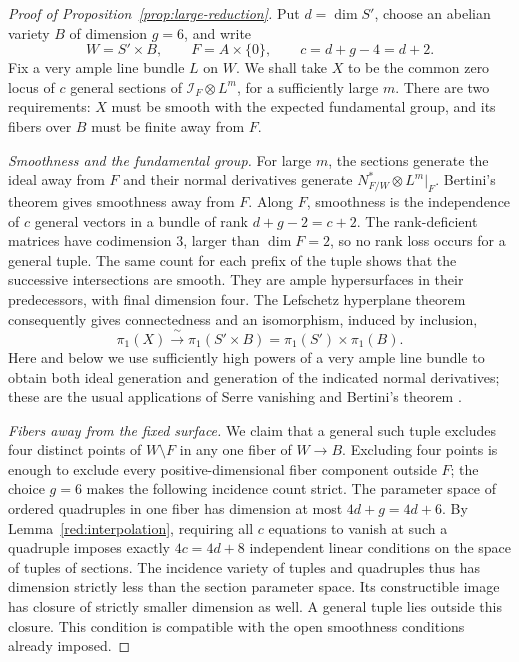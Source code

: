 \begin{proof}[Proof of Proposition~\ref{prop:large-reduction}]
Put $d=\dim S'$, choose an abelian variety $B$ of dimension $g=6$, and
write
\[
 W=S'\times B,\qquad F=A\times\{0\},\qquad
 c=d+g-4=d+2.
\]
Fix a very ample line bundle $L$ on $W$.  We shall take $X$ to be the
common zero locus of $c$ general sections of
$\mathcal I_F\otimes L^m$, for a sufficiently large $m$.
There are two requirements: $X$ must be smooth with the expected
fundamental group, and its fibers over $B$ must be finite away from $F$.

\smallskip
\noindent\emph{Smoothness and the fundamental group.}
For large $m$, the sections generate the ideal away from $F$ and their
normal derivatives generate
$N^*_{F/W}\otimes L^m|_F$.  Bertini's theorem gives smoothness away
from $F$.  Along $F$, smoothness is the independence of $c$ general
vectors in a bundle of rank $d+g-2=c+2$.  The rank-deficient matrices
have codimension $3$, larger than $\dim F=2$, so no rank loss occurs
for a general tuple.  The same count for each prefix of the tuple
shows that the successive intersections are smooth.  They are ample
hypersurfaces in their predecessors, with final dimension four.
The Lefschetz hyperplane theorem consequently gives connectedness and
an isomorphism, induced by inclusion,
\begin{equation}\label{red:fundamental-group}
 \pi_1(X)\xrightarrow{\ \sim\ }
 \pi_1(S'\times B)=\pi_1(S')\times\pi_1(B).
\end{equation}
Here and below we use sufficiently high powers of a very ample line
bundle to obtain both ideal generation and generation of the indicated
normal derivatives; these are the usual applications of Serre
vanishing and Bertini's theorem \cite{Hartshorne}.

\smallskip
\noindent\emph{Fibers away from the fixed surface.}
We claim that a general such tuple excludes four distinct points of
$W\setminus F$ in any one fiber of $W\to B$.  Excluding four points
is enough to exclude every positive-dimensional fiber component
outside $F$; the choice $g=6$ makes the following incidence count
strict.  The parameter space of
ordered quadruples in one fiber has dimension at most $4d+g=4d+6$.
By Lemma~\ref{red:interpolation}, requiring all $c$ equations to
vanish at such a quadruple imposes exactly $4c=4d+8$ independent
linear conditions on the space of tuples of sections.  The incidence
variety of tuples and quadruples thus has dimension strictly less than
the section parameter space.  Its constructible image has closure of
strictly smaller dimension as well.  A general tuple lies outside this
closure.  This condition is compatible with the open smoothness
conditions already imposed.


\end{proof}
